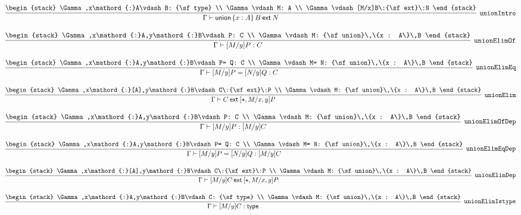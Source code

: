 \[
\infer[{\tt unionIntro}]{\Gamma \vdash {\sf union}\,\{x : A\}\,B\:{\sf ext}\:N}{
\begin{stack}
\Gamma ,x\mathord{:}A\vdash B: {\sf type}
\\
\Gamma \vdash M: A
\\
\Gamma \vdash [M/x]B\:{\sf ext}\:N
\end{stack}}
\]

\[
\infer[{\tt unionElimOf}]{\Gamma \vdash [M/y]P: C}{
\begin{stack}
\Gamma ,x\mathord{:}A,y\mathord{:}B\vdash P: C
\\
\Gamma \vdash M: {\sf union}\,\{x : A\}\,B
\end{stack}}
\]

\[
\infer[{\tt unionElimEq}]{\Gamma \vdash [M/y]P= [N/y]Q: C}{
\begin{stack}
\Gamma ,x\mathord{:}A,y\mathord{:}B\vdash P= Q: C
\\
\Gamma \vdash M= N: {\sf union}\,\{x : A\}\,B
\end{stack}}
\]

\[
\infer[{\tt unionElim}]{\Gamma \vdash C\:{\sf ext}\:[\star , M/x, y]P}{
\begin{stack}
\Gamma ,x\mathord{:}[A],y\mathord{:}B\vdash C\:{\sf ext}\:P
\\
\Gamma \vdash M: {\sf union}\,\{x : A\}\,B
\end{stack}}
\]

\[
\infer[{\tt unionElimOfDep}]{\Gamma \vdash [M/y]P: [M/y]C}{
\begin{stack}
\Gamma ,x\mathord{:}A,y\mathord{:}B\vdash P: C
\\
\Gamma \vdash M: {\sf union}\,\{x : A\}\,B
\end{stack}}
\]

\[
\infer[{\tt unionElimEqDep}]{\Gamma \vdash [M/y]P= [N/y]Q: [M/y]C}{
\begin{stack}
\Gamma ,x\mathord{:}A,y\mathord{:}B\vdash P= Q: C
\\
\Gamma \vdash M= N: {\sf union}\,\{x : A\}\,B
\end{stack}}
\]

\[
\infer[{\tt unionElimDep}]{\Gamma \vdash [M/y]C\:{\sf ext}\:[\star , M/x, y]P}{
\begin{stack}
\Gamma ,x\mathord{:}[A],y\mathord{:}B\vdash C\:{\sf ext}\:P
\\
\Gamma \vdash M: {\sf union}\,\{x : A\}\,B
\end{stack}}
\]

\[
\infer[{\tt unionElimIstype}]{\Gamma \vdash [M/y]C: {\sf type}}{
\begin{stack}
\Gamma ,x\mathord{:}A,y\mathord{:}B\vdash C: {\sf type}
\\
\Gamma \vdash M: {\sf union}\,\{x : A\}\,B
\end{stack}}
\]

